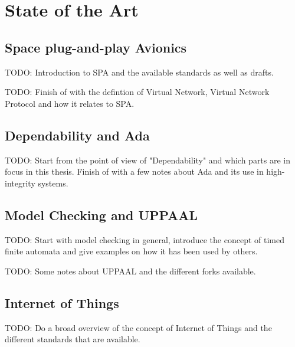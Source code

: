 \chapter{State of the Art} \label{ch:state_of_the_art}

\section{Space plug-and-play Avionics}
TODO: Introduction to SPA and the available standards as well as drafts.

TODO: Finish of with the defintion of Virtual Network, Virtual Network
Protocol and how it relates to SPA.

\section{Dependability and Ada}
TODO: Start from the point of view of "Dependability" and which parts are in
focus in this thesis. Finish of with a few notes about Ada and its use in
high-integrity systems.

\section{Model Checking and UPPAAL}
TODO: Start with model checking in general, introduce the concept of timed
finite automata and give examples on how it has been used by others.

TODO: Some notes about UPPAAL and the different forks available.

\section{Internet of Things}
TODO: Do a broad overview of the concept of Internet of Things and the
different standards that are available.
